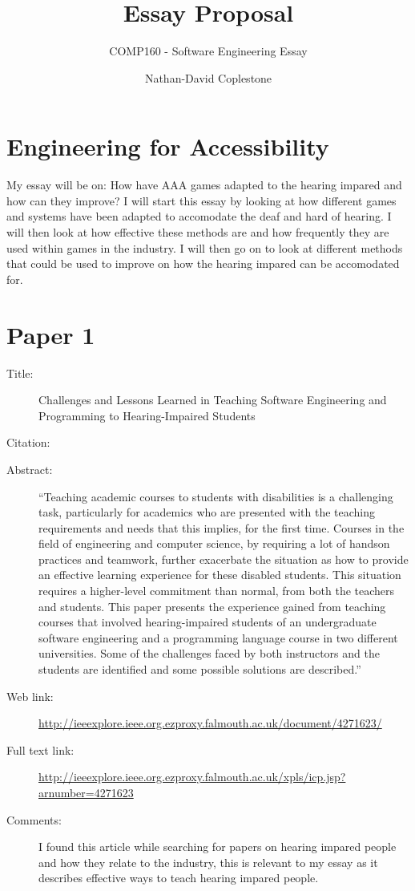 \documentclass{scrartcl}
\title{Essay Proposal}
\subtitle{COMP160 - Software Engineering Essay}
\author{Nathan-David Coplestone}
\begin{document}
\maketitle

\section*{Engineering for Accessibility}

My essay will be on: How have AAA games adapted to the hearing impared and how can they improve? I will start this essay by looking at how different games and systems have been adapted to accomodate the deaf and hard of hearing. I will then look at how effective these methods are and how frequently they are used within games in the industry. I will then go on to look at different methods that could be used to improve on how the hearing impared can be accomodated for.

\section*{Paper 1}

\begin{description}
\item[Title:] Challenges and Lessons Learned in Teaching Software Engineering and Programming to Hearing-Impaired Students
\item[Citation:] \cite{Distante}
\item[Abstract:] ``Teaching academic courses to students with disabilities is a challenging task, particularly for academics who are presented with the teaching requirements and needs that this implies, for the first time. Courses in the field of engineering and computer science, by requiring a lot of handson practices and teamwork, further exacerbate the situation as how to provide an effective learning experience for these disabled students. This situation requires a higher-level commitment than normal, from both the teachers and students. This paper presents the experience gained from teaching courses that involved hearing-impaired students of an undergraduate software engineering and a programming language course in two different universities. Some of the challenges faced by both instructors and the students are identified and some possible solutions are described.''
\item[Web link:] \url{http://ieeexplore.ieee.org.ezproxy.falmouth.ac.uk/document/4271623/}
\item[Full text link:] \url{http://ieeexplore.ieee.org.ezproxy.falmouth.ac.uk/xpls/icp.jsp?arnumber=4271623}
\item[Comments:] I found this article while searching for papers on hearing impared people and how they relate to the industry, this is relevant to my essay as it describes effective ways to teach hearing impared people.
\end{description}
\end{document}
